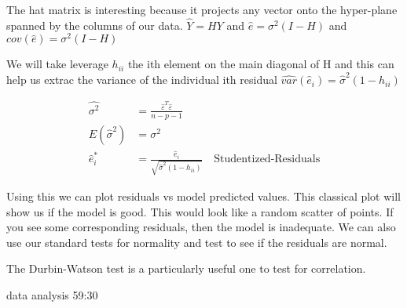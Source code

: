 The hat matrix is interesting because it projects any vector onto the hyper-plane spanned by the columns of our data. $\hat{Y}=HY$ and $\hat{e} = \sigma^2(I-H)$ and $cov(\hat{e})=\sigma^2 (I-H)$

We will take leverage $h_{ii}$ the ith element on the main diagonal of H and this can help us extrac the variance of the individual ith residual
$\hat{var}(\hat{e}_i)=\hat{\sigma}^2(1-h_{ii})$

\begin{align*}
    \hat{\sigma^2} &= \frac{\hat{\varepsilon}^T\hat{\varepsilon}}{n-p-1} \\
    E(\hat{\sigma}^2) &=\sigma^2\\
    \hat{e}_i^* &=\frac{\hat{e}_i}{\sqrt{\hat{\sigma}^2(1-h_{ii})}} \quad \text{Studentized-Residuals}
\end{align*}

Using this we can plot residuals vs model predicted values. This classical plot will show us if the model is good. This would look like a random scatter of points. If you see some corresponding residuals, then the model is inadequate. We can also use our standard tests for normality and test to see if the residuals are normal.

The Durbin-Watson test is a particularly useful one to test for correlation.

data analysis 59:30
